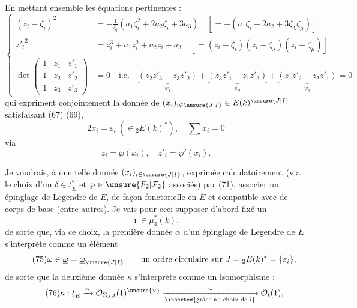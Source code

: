 En mettant ensemble les équations pertinentes :
\[
\tag{71}
\left\{\begin{aligned}
(z_i-\zeta_i)^2&=-\frac{1}{\zeta_i}(a_1\zeta_i^2+2a_2\zeta_i+3a_3)
\quad[=-(a_1\zeta_i+2a_2+3\zeta_\lambda\zeta_\mu)]\\
{z'_i}^2&=z_i^3+a_1z_i^2+a_2z_i+a_3
\quad[=(z_i-\zeta_i)(z_i-\zeta_\lambda)(z_i-\zeta_\mu)]\\
\det\begin{pmatrix}1&z_1&z'_1\\1&z_2&z'_2\\1&z_3&z'_3\end{pmatrix}&=0
\quad\text{i.e.}\quad
\underbrace{(z_2z'_3-z_3z'_2)}_{\psi_1}
+\underbrace{(z_3z'_1-z_1z'_3)}_{\psi_2}
+\underbrace{(z_1z'_2-z_2z'_1)}_{\psi_3}=0
\end{aligned}\right.
\]
qui expriment conjointement la donnée de $(x_i)_{i\in\unsure{J|I}}\in E(k)^{\unsure{J|I}}$ satisfaisant (67) (69),
\[
\tag{72}
2x_i=\varepsilon_i\ (\in{}_2E(k)^*),\quad \sum x_i=0
\]
via
\[
\tag{73}
z_i=\wp(x_i),\quad z'_i=\wp'(x_i).
\]

Je voudrais, à une telle donnée $(x_i)_{i\in\unsure{J|I}}$, exprimée calculatoirement (via le choix d'un $\delta\in\underline{t}_E^*$ et $\wp\in\unsure{F_2|\mathcal F_2}$ associés) par (71), associer  un \uline{épinglage de Legendre de $E$}, de façon fonctorielle en $E$ et compatible avec  de corps de base (entre autres). Je vais pour ceci supposer d'abord fixé un
\[
\tag{74}
\hat\imath\in\mu_4^*(k),
\]
de sorte que, via ce choix, la première donnée $\alpha$ d'un épinglage de Legendre de $E$ s'interprète comme un élément
\[
\tag{75}
\omega\in\underline{\omega}=\underline{\omega}_{\unsure{J|I}}
\qquad
\text{un ordre circulaire sur }J={}_2E(k)^*=\{\varepsilon_i\},
\]
\margin{$\alpha=\hat\imath\wedge\omega$}
de sorte que la deuxième donnée $\kappa$ s'interprète comme un isomorphisme :
\[
\tag{76}
\kappa:\underline{t}_E\xrightarrow{\sim}
\mathcal O_{\Sigma_J,t}(1)^{\unsure{\vee}}
\xrightarrow[\inserted{\text{grâce au choix de }\hat\imath}]{\sim}
\mathcal O_t(1),
\]
